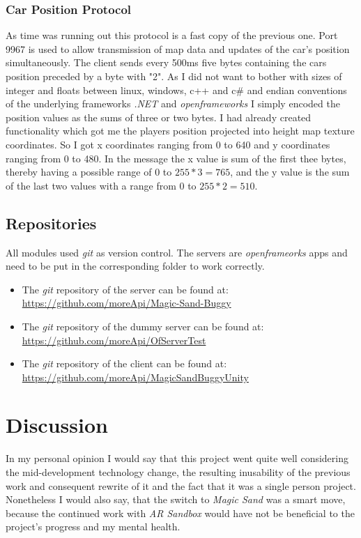 \documentclass[12pt,a4paper,twoside,titlepage,headsepline,numbers=noenddot,listof=totoc,index=totoc,bibliography=totoc]{scrartcl}
\theoremstyle{break}
\begin{document}
\subsubsection{Car Position Protocol}
As time was running out this protocol is a fast copy of the previous one. Port 9967 is used to allow transmission of map data and updates of the car's position simultaneously. The client sends every 500ms five bytes containing the cars position preceded by a byte with "2". As I did not want to bother with sizes of integer and floats between linux, windows, c++ and c\# and endian conventions of the underlying frameworks \textit{.NET} and \textit{openframeworks} I simply encoded the position values as the sums of three or two bytes. I had already created functionality which got me the players position projected into height map texture coordinates. So I got x coordinates ranging from 0 to 640 and y coordinates ranging from 0 to 480. In the message the x value is sum of the first thee bytes, thereby having a possible range of 0 to $255*3=765$, and the y value is the sum of the last two values with a range from 0 to $255*2=510$.

\subsection{Repositories}
All modules used \textit{git} as version control. The servers are \textit{openframeorks} apps and need to be put in the corresponding folder to work correctly.

\begin{itemize}
	\item The \textit{git} repository of the server can be found at:\\ \url{https://github.com/moreApi/Magic-Sand-Buggy}
	\item The \textit{git} repository of the dummy server can be found at:\\ \url{https://github.com/moreApi/OfServerTest}
	\item The \textit{git} repository of the client can be found at:\\ \url{https://github.com/moreApi/MagicSandBuggyUnity}
\end{itemize}

\section{Discussion}
In my personal opinion I would say that this project went quite well considering the mid-development technology change, the resulting inusability of the previous work and consequent rewrite of it and the fact that it was a single person project. Nonetheless I would also say, that the switch to \textit{Magic Sand} was a smart move, because the continued work with \textit{AR Sandbox} would have not be beneficial to the project's progress and my mental health. 
\end{document}
